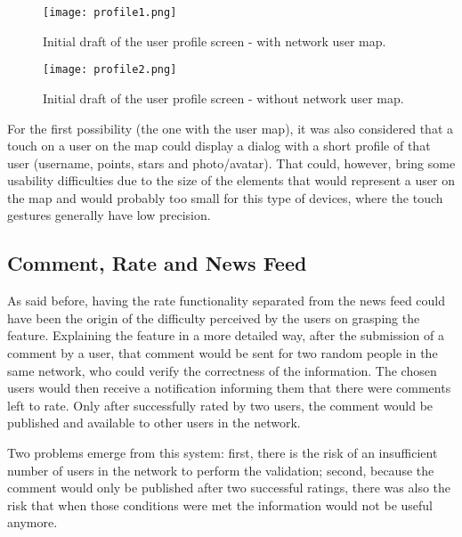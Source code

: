 \begin{figure}[h!]
  \begin{center}
    \leavevmode
    \texttt{[image: profile1.png]}
    \caption{Initial draft of the user profile screen - with network user map.}
    \label{fig:profile1}
  \end{center}
\end{figure}

\begin{figure}[h!]
  \begin{center}
    \leavevmode
    \texttt{[image: profile2.png]}
    \caption{Initial draft of the user profile screen - without network user map.}
    \label{fig:profile2}
  \end{center}
\end{figure}

For the first possibility (the one with the user map), it was also considered that a touch on a user on the map could display a dialog with a short profile of that user (username, points, stars and photo/avatar). That could, however, bring some usability difficulties due to the size of the elements that would represent a user on the map and would probably too small for this type of devices, where the touch gestures generally have low precision.

\subsection{Comment, Rate and News Feed}\label{rateinitial}

As said before, having the rate functionality separated from the news feed could have been the origin of the difficulty perceived by the users on grasping the feature. Explaining the feature in a more detailed way, after the submission of a comment by a user, that comment would be sent for two random people in the same network, who could verify the correctness of the information. 
The chosen users would then receive a notification informing them that there were comments left to rate. Only after successfully rated by two users, the comment would be published and available to other users in the network.

Two problems emerge from this system: first, there is the risk of an insufficient number of users in the network to perform the validation; second, because the comment would only be published after two successful ratings, there was also the risk that when those conditions were met the information would not be useful anymore.

